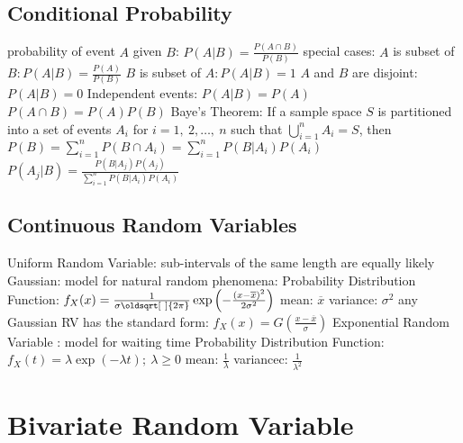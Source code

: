 \documentclass[a4paper,11pt]{article}
\renewcommand*{\sqrt}[2][\ ]{\oldsqrt[#1]{#2}}
\begin{document}
	\subsection{Conditional Probability}
	\begin{outline}[enumerate]
		\1 probability of event $A$ given $B$: $P\left(A | B\right) = \frac{P\left(A \cap B\right)}{P\left(B\right)}$
		\1 special cases:
			\2 $A$ is subset of $B: P\left(A | B\right) = \frac{P\left(A\right)}{P\left(B\right)}$
			\2 $B$ is subset of $A: P\left(A | B\right) = 1$
			\2 $A$ and $B$ are disjoint: $P\left(A | B\right) = 0$
		\1 Independent events: $P\left(A | B\right) = P\left(A\right)$ 
			\2 $P\left(A \cap B\right) = P\left(A\right)P\left(B\right)$
		\1 Baye's Theorem: If a sample space $S$ is partitioned into a set of events $A_{i}$ for $i = 1,~2,\ldots,~n$ such that $\bigcup_{i=1}^{n} A_{i} = S$, then $P\left(B\right) = \sum_{i = 1}^{n}P\left(B \cap A_{i}\right) = \sum_{i = 1}^{n}P\left(B | A_{i}\right)P\left(A_{i}\right) $	
		\1 $P\left(A_{j} | B\right) = \frac{P\left(B | A_{j}\right)P\left(A_{j}\right)}{\sum_{i = 1}^{n}P\left(B | A_{i}\right)P\left(A_{i}\right)}$
	\end{outline}

	\subsection{Continuous Random Variables}
	\begin{outline}[enumerate]
		\1 Uniform Random Variable: sub-intervals of the same length are equally likely
		\1 Gaussian: model for natural random phenomena:
			\2 Probability Distribution Function: $f_{X}(x) = \frac{1}{\sigma\sqrt{2\pi}}\exp\left(-\frac{\left(x - \overline{x}\right)^{2}}{2\sigma^2}\right)$
			\2 mean: $\overline{x}$
			\2 variance: $\sigma^{2}$
		\1 any Gaussian RV has the standard form: $f_{X}(x) = G\left(\frac{x - \overline{x}}{\sigma}\right)$
		\1 Exponential Random Variable : model for waiting time
		 	\2 Probability Distribution Function: $f_{X}(t) = \lambda\exp\left(-\lambda t\right);~\lambda \geq 0$
		 	\2 mean: $\frac{1}{\lambda}$
		 	\2 variancec: $\frac{1}{\lambda^{2}}$	
	\end{outline}

	\section{Bivariate Random Variable}
	
\end{document}
